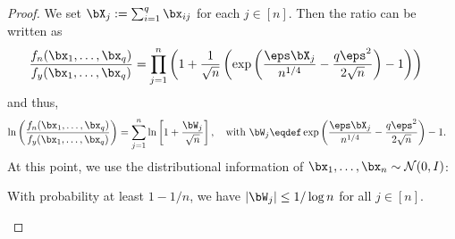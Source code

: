 \begin{proof} 
We set $\bX_j := \sum_{i=1}^q \bx_{ij}$ for each $j\in [n]$. %
Then the ratio can be written as
\begin{align}
\frac{f_n(\bx_1, \ldots, \bx_q)}{f_y(\bx_1, \ldots, \bx_q)}
&= \prod_{j=1}^n\left( 1 + \frac{1}{\sqrt{n}}\left( \exp\left(\frac{\eps\bX_j}{n^{1/4}}  - \frac{q\eps^2}{2\sqrt{n}}\right)-1\right)\right)
\end{align}
and thus, 
\begin{align}
 \ln\left( \frac{f_n(\bx_1, \ldots, \bx_q)}{f_y(\bx_1,  \ldots, \bx_q)}\right) 
&= %
  \sum_{j=1}^n \ln\left[ 1 + \frac{\bW_j}{\sqrt{n}}\right],
  \quad \text{with\ }\bW_j \eqdef \exp\left(\frac{\eps \bX_j}{n^{1/4}} - \frac{q\eps^2}{2\sqrt{n}}\right) - 1.
  \label{eq:wj}
\end{align}
%
At this point, we use the distributional information of $\bx_1, \ldots, \bx_n\sim \cN(0,I)$:

\begin{claim} \label{clm:wj} With probability at least $1-1/n$, we have 
$|\bW_j| \leq 1/\log n$ for all $j \in [n]$.
\end{claim}


\end{proof}
